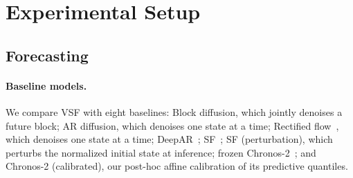 \clearpage
\section{Experimental Setup}
\label{sec:experimental-setup}

\subsection{Forecasting}
\label{sec:forecasting-setup}

\paragraph{Baseline models.}
We compare VSF with eight baselines: Block diffusion, which jointly denoises
a future block; AR diffusion, which denoises one state at a time;
Rectified
flow~\citep{liu2022flow}, which denoises one state at a time;
DeepAR~\citep{salinas2020deepar}; SF~\citep{jiang2025streaming};
SF (perturbation), which perturbs the normalized initial state at inference;
frozen Chronos-2~\citep{ansari2025chronos}; and Chronos-2 (calibrated), our
post-hoc affine calibration of its predictive quantiles.

